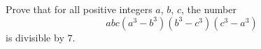 Prove that for all positive integers $a$, $b$, $c$, the number
\[
abc\left(a^3-b^3\right)\left(b^3-c^3\right)\left(c^3-a^3\right)
\]
is divisible by $7$.
